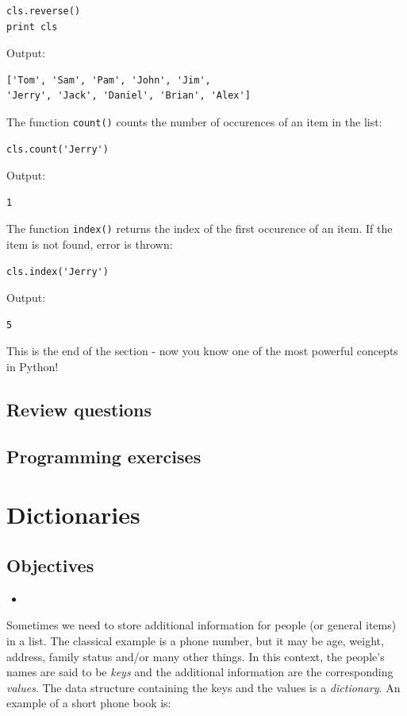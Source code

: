\begin{verbatim}
cls.reverse()
print cls
\end{verbatim}
Output:

\begin{verbatim}
['Tom', 'Sam', 'Pam', 'John', 'Jim', 
'Jerry', 'Jack', 'Daniel', 'Brian', 'Alex']
\end{verbatim}
The function {\tt count()} counts the number of occurences of an item
in the list:

\begin{verbatim}
cls.count('Jerry')
\end{verbatim}
Output:

\begin{verbatim}
1
\end{verbatim}
The function {\tt index()} returns the index of the first occurence 
of an item. If the item is not found, error is thrown:

\begin{verbatim}
cls.index('Jerry')
\end{verbatim}
Output:

\begin{verbatim}
5
\end{verbatim}
This is the end of the section - now you know one of the most powerful 
concepts in Python!

\subsection{Review questions}

\subsection{Programming exercises}


\section{Dictionaries}

\subsection{Objectives}

\begin{itemize}
\item
\end{itemize}

Sometimes we need to store additional information for 
people (or general items) in a list. The classical example is 
a phone number, but it may be age, weight, address, family 
status and/or many other things. In this context, the 
people's names are said to be {\em keys} and the additional 
information are the corresponding {\em values}. The data structure
containing the keys and the values is a {\em dictionary}. An
example of a short phone book is:

